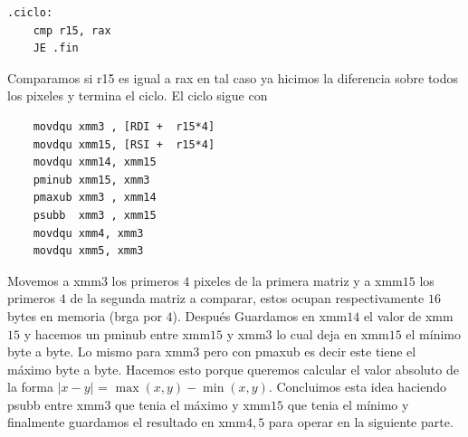 \documentclass[a4paper]{article}
\begin{document}
\begin{codesnippet}
\begin{verbatim}
.ciclo:
    cmp r15, rax
    JE .fin
\end{verbatim}
\end{codesnippet}

\noindent Comparamos si r15 es igual a rax en tal caso ya hicimos la diferencia sobre todos los pixeles y termina el ciclo. El ciclo sigue con

\begin{codesnippet}
\begin{verbatim}
    movdqu xmm3 , [RDI +  r15*4]   
    movdqu xmm15, [RSI +  r15*4]
    movdqu xmm14, xmm15     
    pminub xmm15, xmm3        
    pmaxub xmm3 , xmm14        
    psubb  xmm3 , xmm15             
    movdqu xmm4, xmm3 
    movdqu xmm5, xmm3       
\end{verbatim}
\end{codesnippet}

\noindent Movemos a xmm$3$ los primeros $4$ pixeles de la primera matriz y a xmm$15$ los primeros $4$ de la segunda matriz a comparar, estos ocupan respectivamente $16$ bytes en memoria (brga por $4$). Después Guardamos en xmm$14$ el valor de xmm$15$ y hacemos un pminub entre xmm$15$ y xmm$3$ lo cual deja en xmm$15$ el mínimo byte a byte. Lo mismo para xmm$3$ pero con pmaxub es decir este tiene el máximo byte a byte. Hacemos esto porque queremos calcular el valor absoluto de la forma $|x-y|$ = $\max(x,y) - \min(x,y)$. Concluimos esta idea haciendo psubb entre xmm$3$ que tenia el máximo y xmm$15$ que tenia el mínimo y finalmente guardamos el resultado en xmm$4,5$ para operar en la siguiente parte.
\end{document}
